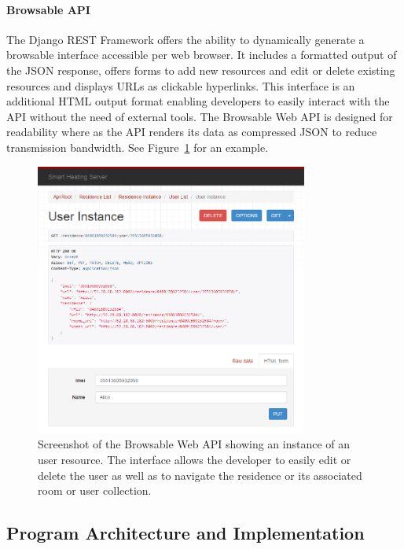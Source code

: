 \paragraph{Browsable API}

The Django REST Framework offers the ability to dynamically generate a browsable interface accessible per web browser.
It includes a formatted output of the JSON response, offers forms to add new resources and edit or delete existing resources and displays URLs as clickable hyperlinks.
This interface is an additional HTML output format enabling developers to easily interact with the API without the need of external tools.
The Browsable Web API is designed for readability where as the API renders its data as compressed JSON to reduce transmission bandwidth.
See Figure~\ref{fig:server_infrastructure_browsable_api} for an example.

\begin{figure}[h]
	\begin{center}
		\includegraphics[width=0.8\textwidth]{images/server_browable_api_user_instance.png}
	\end{center}
	\caption{Screenshot of the Browsable Web API showing an instance of an user resource. The interface allows the developer to easily edit or delete the user as well as to navigate the residence or its associated room or user collection.}
	\label{fig:server_infrastructure_browsable_api}
\end{figure}


\subsection{Program Architecture and Implementation}

